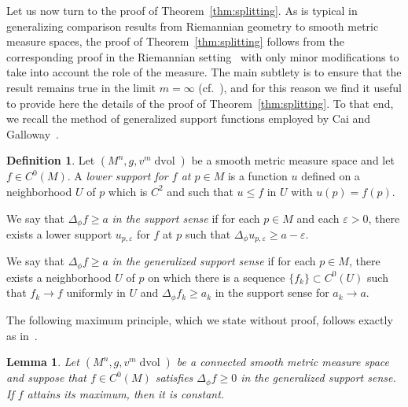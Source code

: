 \documentclass{amsart}
\newtheorem{lem}[thm]{Lemma}
\theoremstyle{definition}
\newtheorem{defn}[thm]{Definition}
\theoremstyle{remark}
\numberwithin{equation}{section}
\begin{document}
Let us now turn to the proof of Theorem~\ref{thm:splitting}.  As is typical in generalizing comparison results from Riemannian geometry to smooth metric measure spaces, the proof of Theorem~\ref{thm:splitting} follows from the corresponding proof in the Riemannian setting~\cite[Theorem~3]{CaiGalloway1999} with only minor modifications to take into account the role of the measure.  The main subtlety is to ensure that the result remains true in the limit $m=\infty$ (cf.\ \cite{Wei_Wylie}), and for this reason we find it useful to provide here the details of the proof of Theorem~\ref{thm:splitting}.  To that end, we recall the method of generalized support functions employed by Cai and Galloway~\cite{CaiGalloway1999}.

\begin{defn}
Let $(M^n,g,v^m\operatorname{dvol})$ be a smooth metric measure space and let $f\in C^0(M)$.  A \emph{lower support for $f$ at $p\in M$} is a function $u$ defined on a neighborhood $U$ of $p$ which is $C^2$ and such that $u\leq f$ in $U$ with $u(p)=f(p)$.

We say that $\Delta_\phi f\geq a$ \emph{in the support sense} if for each $p\in M$ and each $\varepsilon>0$, there exists a lower support $u_{p,\varepsilon}$ for $f$ at $p$ such that $\Delta_\phi u_{p,\varepsilon}\geq a-\varepsilon$.

We say that $\Delta_\phi f\geq a$ \emph{in the generalized support sense} if for each $p\in M$, there exists a neighborhood $U$ of $p$ on which there is a sequence $\{f_k\}\subset C^0(U)$ such that $f_k\to f$ uniformly in $U$ and $\Delta_\phi f_k\geq a_k$ in the support sense for $a_k\to a$.
\end{defn}

The following maximum principle, which we state without proof, follows exactly as in~\cite{CaiGalloway1999,EschenburgHeintze1984}.

\begin{lem}
Let $(M^n,g,v^m\operatorname{dvol})$ be a connected smooth metric measure space and suppose that $f\in C^0(M)$ satisfies $\Delta_\phi f\geq 0$ in the generalized support sense.  If $f$ attains its maximum, then it is constant.
\end{lem}
\end{document}
